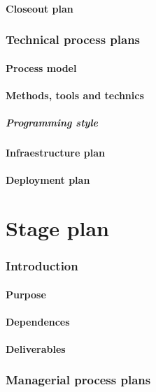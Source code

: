 \documentclass[twocolumn]{article}
\begin{document}
\subsection{Closeout plan}

\section{Technical process plans}
\subsection{Process model}
\subsection{Methods, tools and technics}
\subsubsection{Programming style}
\subsection{Infraestructure plan}
\subsection{Deployment plan}

\part{Stage plan}

\section{Introduction}

\subsection{Purpose}
\subsection{Dependences}
\subsection{Deliverables}

\section{Managerial process plans}
\end{document}

